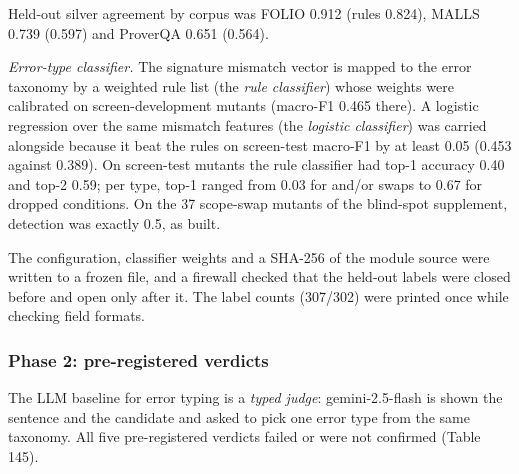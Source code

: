 \documentclass[11pt,letterpaper]{article}
\begin{document}
Held-out silver agreement by corpus was FOLIO 0.912 (rules 0.824), MALLS 0.739 (0.597) and ProverQA 0.651 (0.564).

\emph{Error-type classifier.} The signature mismatch vector is mapped to the error taxonomy by a weighted rule list (the \emph{rule classifier}) whose weights were calibrated on screen-development mutants (macro-F1 0.465 there). A logistic regression over the same mismatch features (the \emph{logistic classifier}) was carried alongside because it beat the rules on screen-test macro-F1 by at least 0.05 (0.453 against 0.389). On screen-test mutants the rule classifier had top-1 accuracy 0.40 and top-2 0.59; per type, top-1 ranged from 0.03 for and/or swaps to 0.67 for dropped conditions. On the 37 scope-swap mutants of the blind-spot supplement, detection was exactly 0.5, as built.

The configuration, classifier weights and a SHA-256 of the module source were written to a frozen file, and a firewall checked that the held-out labels were closed before and open only after it. The label counts (307/302) were printed once while checking field formats.

\subsubsection{Phase 2: pre-registered verdicts}

The LLM baseline for error typing is a \emph{typed judge}: gemini-2.5-flash is shown the sentence and the candidate and asked to pick one error type from the same taxonomy. All five pre-registered verdicts failed or were not confirmed (Table 145).
\end{document}
